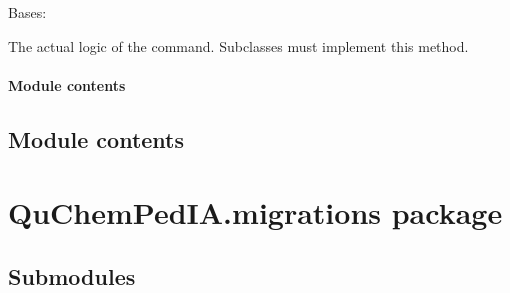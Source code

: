 \documentclass[letterpaper,10pt,english]{sphinxmanual}
\begin{document}
\begin{fulllineitems}
\label{\detokenize{QuChemPedIA.management.commands:QuChemPedIA.management.commands.populate_db.Command}}
Bases: 

\begin{fulllineitems}
\label{\detokenize{QuChemPedIA.management.commands:QuChemPedIA.management.commands.populate_db.Command.handle}}
The actual logic of the command. Subclasses must implement
this method.

\end{fulllineitems}


\end{fulllineitems}



\paragraph{Module contents}
\label{\detokenize{QuChemPedIA.management.commands:module-QuChemPedIA.management.commands}}\label{\detokenize{QuChemPedIA.management.commands:module-contents}}

\subsection{Module contents}
\label{\detokenize{QuChemPedIA.management:module-QuChemPedIA.management}}\label{\detokenize{QuChemPedIA.management:module-contents}}

\section{QuChemPedIA.migrations package}
\label{\detokenize{QuChemPedIA.migrations:quchempedia-migrations-package}}\label{\detokenize{QuChemPedIA.migrations::doc}}

\subsection{Submodules}
\label{\detokenize{QuChemPedIA.migrations:submodules}}
\end{document}
